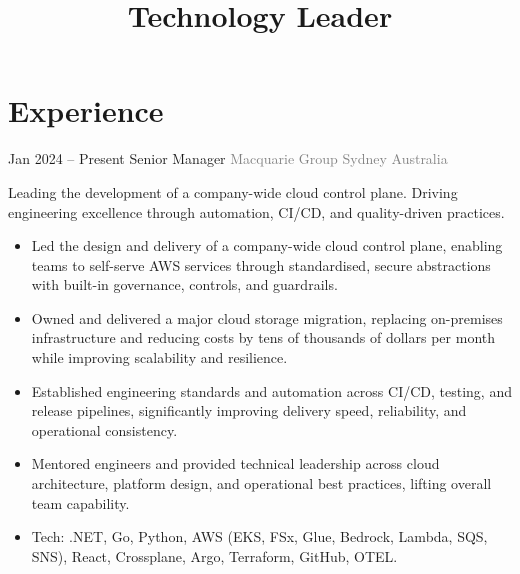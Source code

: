 \documentclass[14pt, a4paper, sans]{moderncv}
\title{Technology Leader}
\begin{document}
    \makecvtitle

    \section{Experience}\label{sec:experience}

    \cventry
    {Jan 2024 -- Present}
    {Senior Manager}
    {\newline \textcolor{gray}{Macquarie Group}}
    {\textcolor{gray}{Sydney}}
    {\textcolor{gray}{Australia}}
    {
        \fontsize{13}{16}\selectfont
        Leading the development of a company-wide cloud control plane. Driving engineering excellence through automation, CI/CD, and quality-driven practices.
        \begin{itemize}
            \item Led the design and delivery of a company-wide cloud control plane, enabling teams to self-serve AWS services through standardised, secure abstractions with built-in governance, controls, and guardrails.
            \item Owned and delivered a major cloud storage migration, replacing on-premises infrastructure and reducing costs by tens of thousands of dollars per month while improving scalability and resilience.
            \item Established engineering standards and automation across CI/CD, testing, and release pipelines, significantly improving delivery speed, reliability, and operational consistency.
            \item Mentored engineers and provided technical leadership across cloud architecture, platform design, and operational best practices, lifting overall team capability.
            \item Tech: .NET, Go, Python, AWS (EKS, FSx, Glue, Bedrock, Lambda, SQS, SNS), React, Crossplane, Argo, Terraform, GitHub, OTEL.
        \end{itemize}
    }
\end{document}
